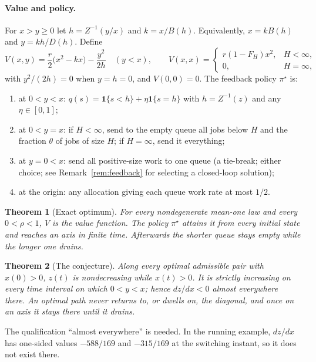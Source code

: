 \documentclass[11pt]{article}
\numberwithin{equation}{section}
\newtheorem{theorem}{Theorem}
\theoremstyle{definition}
\theoremstyle{remark}
\newcommand{\one}{\mathbf{1}}
\begin{document}
\paragraph{Value and policy.} For $x>y\ge0$ let $h=Z^{-1}(y/x)$ and $k=x/B(h)$. Equivalently, $x=kB(h)$ and $y=kh/D(h)$. Define
\begin{equation}\label{eq:V}
V(x,y)=\frac r2\bigl(x^2-kx\bigr)-\frac{y^2}{2h}\quad(y<x),\qquad
V(x,x)=\begin{cases}r(1-F_H)x^2,&H<\infty,\\0,&H=\infty,\end{cases}
\end{equation}
with $y^2/(2h)=0$ when $y=h=0$, and $V(0,0)=0$. The feedback policy $\pi^\star$ is:
\begin{enumerate}
\item at $0<y<x$: $q(s)=\one\{s<h\}+\eta\one\{s=h\}$ with $h=Z^{-1}(z)$ and any $\eta\in[0,1]$;
\item at $0<y=x$: if $H<\infty$, send to the empty queue all jobs below $H$ and the fraction $\theta$ of jobs of size $H$; if $H=\infty$, send it everything;
\item at $y=0<x$: send all positive-size work to one queue (a tie-break; either choice; see Remark~\ref{rem:feedback} for selecting a closed-loop solution);
\item at the origin: any allocation giving each queue work rate at most $1/2$.
\end{enumerate}

\begin{theorem}[Exact optimum]\label{thm:value}
For every nondegenerate mean-one law and every $0<\rho<1$, $V$ is the value function. The policy $\pi^\star$ attains it from every initial state and reaches an axis in finite time. Afterwards the shorter queue stays empty while the longer one drains.
\end{theorem}

\begin{theorem}[The conjecture]\label{thm:monotone}
Along every optimal admissible pair with $x(0)>0$, $z(t)$ is nondecreasing while $x(t)>0$. It is strictly increasing on every time interval on which $0<y<x$; hence $dz/dx<0$ almost everywhere there. An optimal path never returns to, or dwells on, the diagonal, and once on an axis it stays there until it drains.
\end{theorem}

The qualification ``almost everywhere'' is needed. In the running example, $dz/dx$ has one-sided values $-588/169$ and $-315/169$ at the switching instant, so it does not exist there.
\end{document}
